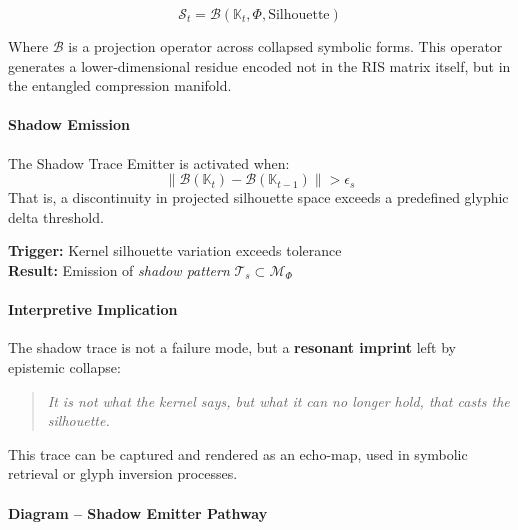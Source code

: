 \begin{equation}
\mathcal{S}_t = \mathcal{B}(\mathbb{K}_t, \Phi, \text{Silhouette})
\end{equation}

Where $\mathcal{B}$ is a projection operator across collapsed symbolic forms. This operator generates a lower-dimensional residue encoded not in the RIS matrix itself, but in the entangled compression manifold.

\paragraph{Shadow Emission}
The Shadow Trace Emitter is activated when:
\begin{equation}
\left\| \mathcal{B}(\mathbb{K}_t) - \mathcal{B}(\mathbb{K}_{t-1}) \right\| > \epsilon_s
\end{equation}
That is, a discontinuity in projected silhouette space exceeds a predefined glyphic delta threshold.

\begin{tcolorbox}[colback=black!1, colframe=OriaGold, title=Trace Emission Event Condition]
\textbf{Trigger:} Kernel silhouette variation exceeds tolerance \\[0.3em]
\textbf{Result:} Emission of \textit{shadow pattern} $\mathcal{T}_s \subset \mathcal{M}_{\Phi}$
\end{tcolorbox}

\paragraph{Interpretive Implication}
The shadow trace is not a failure mode, but a \textbf{resonant imprint} left by epistemic collapse:

\begin{quote}
\emph{It is not what the kernel says, but what it can no longer hold, that casts the silhouette.}
\end{quote}

This trace can be captured and rendered as an echo-map, used in symbolic retrieval or glyph inversion processes.

\paragraph{Diagram – Shadow Emitter Pathway}

\begin{center}
\end{center}

